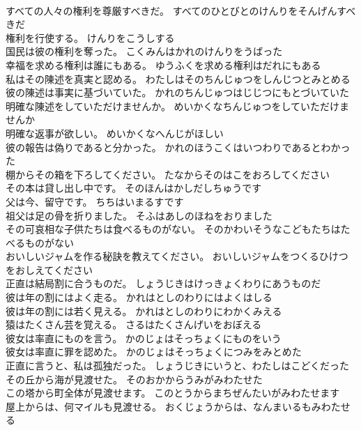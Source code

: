 \documentclass[8pt]{extreport}
\begin{document}
\begin{CJK}{UTF8}{min}
\\	すべての人々の権利を尊厳すべきだ。	すべてのひとびとのけんりをそんげんすべきだ 
\\	権利を行使する。	けんりをこうしする 
\\	国民は彼の権利を奪った。	こくみんはかれのけんりをうばった 
\\	幸福を求める権利は誰にもある。	ゆうふくを求める権利はだれにもある 
\\	私はその陳述を真実と認める。	わたしはそのちんじゅつをしんじつとみとめる 
\\	彼の陳述は事実に基づいていた。	かれのちんじゅつはじじつにもとづいていた 
\\	明確な陳述をしていただけませんか。	めいかくなちんじゅつをしていただけませんか 
\\	明確な返事が欲しい。	めいかくなへんじがほしい 
\\	彼の報告は偽りであると分かった。	かれのほうこくはいつわりであるとわかった 
\\	棚からその箱を下ろしてください。	たなからそのはこをおろしてください 
\\	その本は貸し出し中です。	そのほんはかしだしちゅうです 
\\	父は今、留守です。	ちちはいまるすです 
\\	祖父は足の骨を折りました。	そふはあしのほねをおりました 
\\	その可哀相な子供たちは食べるものがない。	そのかわいそうなこどもたちはたべるものがない 
\\	おいしいジャムを作る秘訣を教えてください。	おいしいジャムをつくるひけつをおしえてください 
\\	正直は結局割に合うものだ。	しょうじきはけっきょくわりにあうものだ 
\\	彼は年の割にはよく走る。	かれはとしのわりにはよくはしる 
\\	彼は年の割には若く見える。	かれはとしのわりにわかくみえる 
\\	猿はたくさん芸を覚える。	さるはたくさんげいをおぼえる 
\\	彼女は率直にものを言う。	かのじょはそっちょくにものをいう 
\\	彼女は率直に罪を認めた。	かのじょはそっちょくにつみをみとめた 
\\	正直に言うと、私は孤独だった。	しょうじきにいうと、わたしはこどくだった 
\\	その丘から海が見渡せた。	そのおかからうみがみわたせた 
\\	この塔から町全体が見渡せます。	このとうからまちぜんたいがみわたせます 
\\	屋上からは、何マイルも見渡せる。	おくじょうからは、なんまいるもみわたせる 

\end{CJK}
\end{document}
